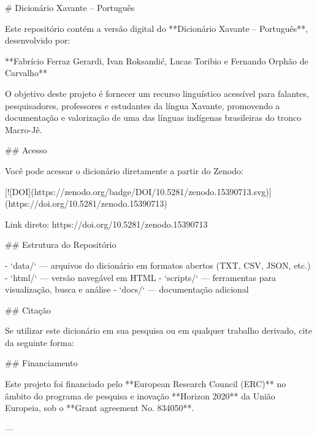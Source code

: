 # Dicionário Xavante – Português

Este repositório contém a versão digital do **Dicionário Xavante – Português**, desenvolvido por:

**Fabrício Ferraz Gerardi, Ivan Roksandić, Lucas Toribio e Fernando Orphão de Carvalho**

O objetivo deste projeto é fornecer um recurso linguístico acessível para falantes, pesquisadores, professores e estudantes da língua Xavante, promovendo a documentação e valorização de uma das línguas indígenas brasileiras do tronco Macro-Jê.

## Acesso

Você pode acessar o dicionário diretamente a partir do Zenodo:

[![DOI](https://zenodo.org/badge/DOI/10.5281/zenodo.15390713.svg)](https://doi.org/10.5281/zenodo.15390713)


Link direto: https://doi.org/10.5281/zenodo.15390713

## Estrutura do Repositório

- `data/` — arquivos do dicionário em formatos abertos (TXT, CSV, JSON, etc.)
- `html/` — versão navegável em HTML
- `scripts/` — ferramentas para visualização, busca e análise
- `docs/` — documentação adicional

## Citação

Se utilizar este dicionário em sua pesquisa ou em qualquer trabalho derivado, cite da seguinte forma:

## Financiamento

Este projeto foi financiado pelo **European Research Council (ERC)** no âmbito do programa de pesquisa e inovação **Horizon 2020** da União Europeia, sob o **Grant agreement No. 834050**.

---
  

